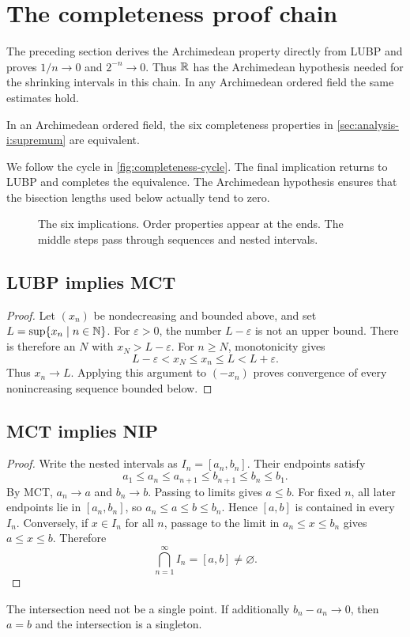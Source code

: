 \section{The completeness proof chain}
\label{sec:analysis-i:completeness-equivalences}

The preceding section derives the Archimedean property directly from
LUBP and proves $1/n\to0$ and $2^{-n}\to0$. Thus $\mathbb{R}$ has the
Archimedean hypothesis needed for the shrinking intervals in this chain.
In any Archimedean ordered field the same estimates hold.

\begin{theorem}
  In an Archimedean ordered field, the six completeness properties in
  \autoref{sec:analysis-i:supremum} are equivalent.
\end{theorem}
We follow the cycle in \autoref{fig:completeness-cycle}.
The final implication returns to LUBP and completes the equivalence.
The Archimedean hypothesis ensures that the bisection lengths used below
actually tend to zero.
\begin{figure}[htbp]
  \centering
  
  \caption[The six completeness implications.]{The six implications. Order properties appear at the ends.
    The middle steps pass through sequences and nested intervals.}
  \label{fig:completeness-cycle}
\end{figure}

\subsection{LUBP implies MCT}
\begin{proof}
  Let $(x_n)$ be nondecreasing and bounded above, and set
  $L=\sup\{x_n\mid n\in\mathbb{N}\}$. For $\varepsilon>0$, the number
  $L-\varepsilon$ is not an upper bound. There is therefore an $N$ with
  $x_N>L-\varepsilon$. For $n\geq N$, monotonicity gives
  \[
    L-\varepsilon<x_N\leq x_n\leq L<L+\varepsilon.
  \]
  Thus $x_n\to L$. Applying this argument to $(-x_n)$ proves convergence
  of every nonincreasing sequence bounded below.
\end{proof}

\subsection{MCT implies NIP}
\begin{proof}
  Write the nested intervals as $I_n=[a_n,b_n]$. Their endpoints satisfy
  \[
    a_1\leq a_n\leq a_{n+1}\leq b_{n+1}\leq b_n\leq b_1.
  \]
  By MCT, $a_n\to a$ and $b_n\to b$. Passing to limits gives $a\leq b$.
  For fixed $n$, all later endpoints lie in $[a_n,b_n]$, so
  $a_n\leq a\leq b\leq b_n$. Hence $[a,b]$ is contained in every $I_n$.
  Conversely, if $x\in I_n$ for all $n$, passage to the limit in
  $a_n\leq x\leq b_n$ gives $a\leq x\leq b$. Therefore
  \[
    \bigcap_{n=1}^{\infty}I_n=[a,b]\ne\varnothing.
  \]
\end{proof}
The intersection need not be a single point. If additionally
$b_n-a_n\to0$, then $a=b$ and the intersection is a singleton.

